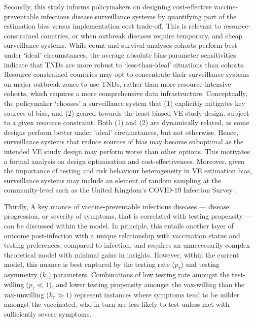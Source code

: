 \documentclass[12pt]{article}
\begin{document}
Secondly, this study informs policymakers on designing cost-effective vaccine-preventable infectious disease surveillance systems by quantifying part of the estimation bias versus implementation cost trade-off. This is relevant to resource-constrained countries, or when outbreak diseases require temporary, and cheap surveillance systems. While count and survival analyses cohorts perform best under `ideal' circumstances, the average absolute bias-parameter sensitivities indicate that TNDs are more robust to `less-than-ideal' situations than cohorts. Resource-constrained countries may opt to concentrate their surveillance systems on major outbreak zones to use TNDs, rather than more resource-intensive cohorts, which requires a more comprehensive data infrastructure. Conceptually, the policymaker `chooses' a surveillance system that (1) explicitly mitigates key sources of bias, and (2) geared towards the least biased VE study design, subject to a given resource constraint. Both (1) and (2) are dynamically related, as some designs perform better under `ideal' circumstances, but not otherwise. Hence, surveillance systems that reduce sources of bias may become suboptimal as the intended VE study design may perform worse than other options. This motivates a formal analysis on design optimisation and cost-effectiveness. Moreover, given the importance of testing and risk behaviour heterogeneity in VE estimation bias, surveillance systems may include an element of random sampling at the community-level such as the United Kingdom's COVID-19 Infection Survey \citep{ons2022survey}.

Thirdly, A key nuance of vaccine-preventable infectious diseases --- disease progression, or severity of symptoms, that is correlated with testing propensity --- can be discussed within the model. In principle, this entails another layer of outcome post-infection with a unique relationship with vaccination status and testing preferences, compared to infection, and requires an unnecessarily complex theoretical model with minimal gains in insights. However, within the current model, this nuance is best captured by the testing rate ($p_\tau$) and testing asymmetry ($k_\tau$) parameters. Combinations of low testing rate amongst the test-willing ($p_\tau \ll 1$), and lower testing propensity amongst the vax-willing than the vax-unwilling ($k_\tau \gg 1$) represent instances where symptoms tend to be milder amongst the vaccinated, who in turn are less likely to test unless met with sufficiently severe symptoms.
\end{document}
